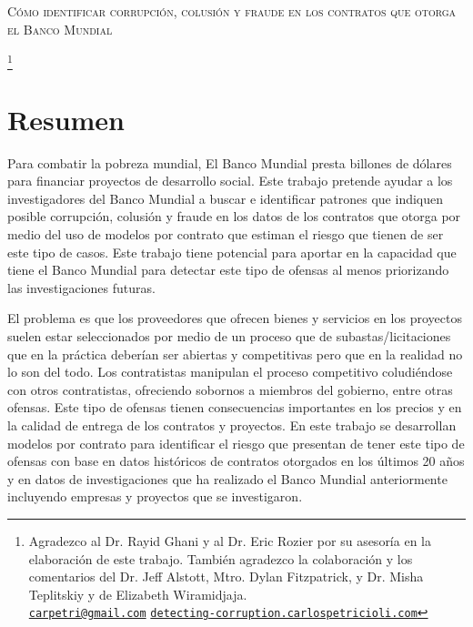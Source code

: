 \thispagestyle{plain}
\begin{center}
\scshape \normalsize Cómo identificar corrupción, colusión y fraude en los contratos que otorga el Banco Mundial
\bigskip

\scshape \normalsize \theauthor\footnote{ \tiny Agradezco al Dr. Rayid Ghani  y al  Dr.  Eric Rozier por su asesoría en la elaboración de este trabajo. También agradezco la colaboración y los comentarios del Dr. Jeff Alstott, Mtro. Dylan Fitzpatrick, y Dr. Misha Teplitskiy y de Elizabeth Wiramidjaja.
\\  \href{mailto:carpetri@gmail.com}{\texttt{carpetri@gmail.com}}  \hfill \href{http://detecting-corruption.carlospetricioli.com}{\texttt{detecting-corruption.carlospetricioli.com}} }
\normalsize
\end{center}

\section*{\centering  \normalsize{Resumen} }
\footnotesize


Para combatir la pobreza mundial, El Banco Mundial presta billones de dólares  para financiar proyectos de desarrollo social. Este trabajo pretende ayudar a los investigadores del Banco Mundial a buscar e identificar patrones que indiquen posible corrupción, colusión y fraude en los datos de los contratos que otorga por medio del uso de modelos por contrato que estiman el riesgo que tienen de ser este tipo de casos. Este trabajo tiene potencial para aportar en la capacidad que tiene el Banco Mundial para detectar este tipo de ofensas al menos priorizando las investigaciones futuras.

El problema es que  los proveedores que ofrecen bienes y servicios en los proyectos suelen estar seleccionados por medio de un proceso que de subastas/licitaciones que en la práctica deberían ser abiertas y competitivas pero que en la realidad no lo son del todo. Los contratistas manipulan el proceso competitivo coludiéndose con otros contratistas, ofreciendo sobornos a miembros del gobierno, entre otras ofensas. Este tipo de ofensas tienen consecuencias importantes en los precios y en la calidad de entrega de los contratos y proyectos. En este trabajo se desarrollan modelos por contrato para identificar el riesgo que presentan de tener este tipo de ofensas con base en datos históricos de contratos otorgados en los últimos 20 años y en datos de investigaciones que ha realizado el Banco Mundial anteriormente incluyendo empresas y proyectos que se investigaron. 

